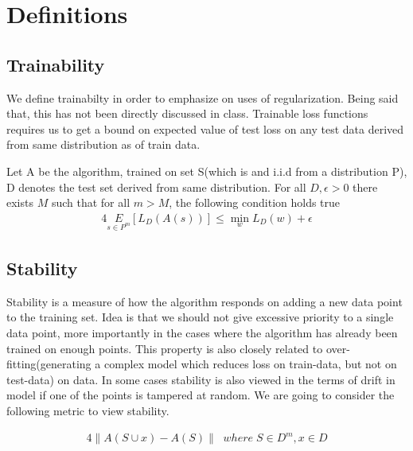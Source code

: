 \documentclass[12pt]{article}
\begin{document}
	\MakeScribeTop


\section{Definitions}

\subsection{Trainability}

We define trainabilty in order to emphasize on uses of regularization. Being said that, this has not been directly discussed in class. Trainable loss functions requires us to get a bound on expected value of test loss on any test data derived from same distribution as of train data.\par
\hfill \break
\noindent Let A be the algorithm, trained on set S(which is and i.i.d from a distribution P), D denotes the test set derived from same distribution.
\hfill \break
For all $D,\epsilon>0$ there exists $M$ such that for all $m>M$, the following condition holds true
\begin{alignat*}{4}
\underset{s\in P^m}{E}[L_{D}(A(s))] \leq \min_{w}L_{D}(w) + \epsilon 
\end{alignat*}
\subsection{Stability}
Stability is a measure of how the algorithm responds on adding a new data point to the training set. Idea is that we should not give excessive priority to a single data point, more importantly in the cases where the algorithm has already been trained on enough points. This property is also closely related to over-fitting(generating a complex model which reduces loss on train-data, but not on test-data) on data. In some cases stability is also viewed in the terms of drift in model if one of the points is tampered at random. We are going to consider the following metric to view stability.

\begin{alignat*}{4}
\| A(S \cup x) - A(S) \| \; \;where \;
S \in D^m , x \in D\\
\end{alignat*}
\end{document}
